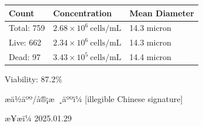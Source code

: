 \documentclass[UTF8,10pt,a4paper,fontset=fandol]{ctexart}
\newcommand{\fieldvalue}[1]{#1}
\newcommand{\handwritten}[1]{#1}
\begin{document}
\begin{center}
\begin{center}
\begin{tabularx}{\textwidth}{@{}lll@{}}
\textbf{Count} & \textbf{Concentration} & \textbf{Mean Diameter} \\
\hline
Total:
\fieldvalue{759}
&
\fieldvalue{$2.68\times 10^{6}\ \mathrm{cells/mL}$}
&
\fieldvalue{14.3 micron}
\\
Live:
\fieldvalue{662}
&
\fieldvalue{$2.34\times 10^{6}\ \mathrm{cells/mL}$}
&
\fieldvalue{14.3 micron}
\\
Dead:
\fieldvalue{97}
&
\fieldvalue{$3.43\times 10^{5}\ \mathrm{cells/mL}$}
&
\fieldvalue{14.4 micron}
\end{tabularx}

\medskip
\noindent
Viability:
\fieldvalue{87.2\%}

\bigskip

\begin{center}
\hfill
{}

\vspace{0.4cm}

\hfill
{}
\end{center}

\vfill

\noindent
æä½äºº/å®¡æ ¸äººï¼
\fieldvalue{\handwritten{[illegible Chinese signature]}}

\hfill
æ¥æï¼
\fieldvalue{\handwritten{2025.01.29}}


\end{center}
\end{center}
\end{document}
